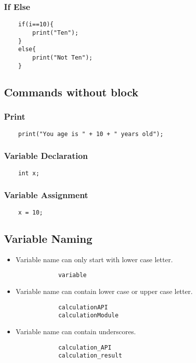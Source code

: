 \documentclass[12pt,letterpaper]{article}
\begin{document}
\subsubsection{If Else}
\begin{verbatim}
    if(i==10){
        print("Ten");
    }
    else{
        print("Not Ten");
    }
\end{verbatim}

\subsection{Commands without block}
\subsubsection{Print}
\begin{verbatim}
    print("You age is " + 10 + " years old");
\end{verbatim}

\subsubsection{Variable Declaration}
\begin{verbatim}
    int x;
\end{verbatim}

\subsubsection{Variable Assignment}
\begin{verbatim}
    x = 10;
\end{verbatim}

\subsection{Variable Naming}
\begin{itemize}
    \item Variable name can only start with lower case letter.
        \begin{verbatim}
            variable
        \end{verbatim}
    \item Variable name can contain lower case or upper case letter.
        \begin{verbatim}
            calculationAPI
            calculationModule
        \end{verbatim}
    \item Variable name can contain underscores.
        \begin{verbatim}
            calculation_API
            calculation_result
        \end{verbatim}
\end{itemize}
\end{document}
